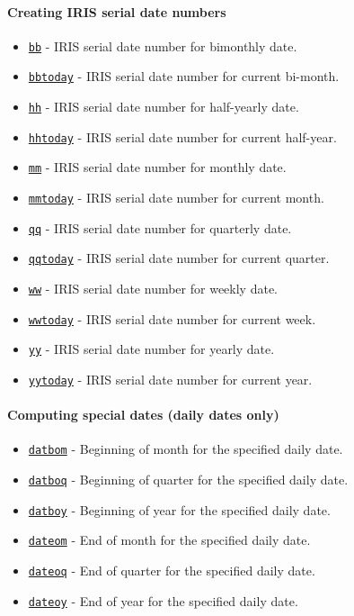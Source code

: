 

	\paragraph{Creating IRIS serial date
numbers}

\begin{itemize}
\itemsep1pt\parskip0pt
\item
  \href{dates/bb}{\texttt{bb}} - IRIS serial date number for bimonthly
  date.
\item
  \href{dates/bbtoday}{\texttt{bbtoday}} - IRIS serial date number for
  current bi-month.
\item
  \href{dates/hh}{\texttt{hh}} - IRIS serial date number for half-yearly
  date.
\item
  \href{dates/hhtoday}{\texttt{hhtoday}} - IRIS serial date number for
  current half-year.
\item
  \href{dates/mm}{\texttt{mm}} - IRIS serial date number for monthly
  date.
\item
  \href{dates/mmtoday}{\texttt{mmtoday}} - IRIS serial date number for
  current month.
\item
  \href{dates/qq}{\texttt{qq}} - IRIS serial date number for quarterly
  date.
\item
  \href{dates/qqtoday}{\texttt{qqtoday}} - IRIS serial date number for
  current quarter.
\item
  \href{dates/ww}{\texttt{ww}} - IRIS serial date number for weekly
  date.
\item
  \href{dates/wwtoday}{\texttt{wwtoday}} - IRIS serial date number for
  current week.
\item
  \href{dates/yy}{\texttt{yy}} - IRIS serial date number for yearly
  date.
\item
  \href{dates/yytoday}{\texttt{yytoday}} - IRIS serial date number for
  current year.
\end{itemize}

\paragraph{Computing special dates (daily dates
only)}

\begin{itemize}
\itemsep1pt\parskip0pt
\item
  \href{dates/datbom}{\texttt{datbom}} - Beginning of month for the
  specified daily date.
\item
  \href{dates/datboq}{\texttt{datboq}} - Beginning of quarter for the
  specified daily date.
\item
  \href{dates/datboy}{\texttt{datboy}} - Beginning of year for the
  specified daily date.
\item
  \href{dates/dateom}{\texttt{dateom}} - End of month for the specified
  daily date.
\item
  \href{dates/dateoq}{\texttt{dateoq}} - End of quarter for the
  specified daily date.
\item
  \href{dates/dateoy}{\texttt{dateoy}} - End of year for the specified
  daily date.
\end{itemize}

